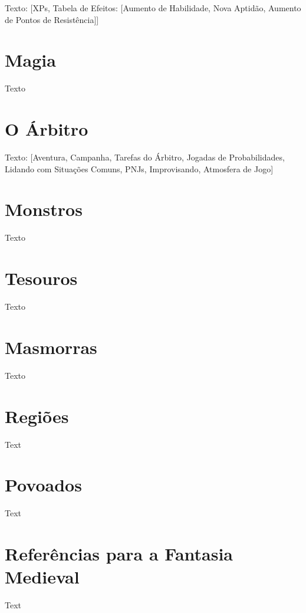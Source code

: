 \documentclass[a4paper, twocolumn, 10pt]{book}
\begin{document}
Texto: [XPs, Tabela de Efeitos: [Aumento de Habilidade, Nova Aptidão, Aumento de Pontos de Resistência]]

\chapter{Magia}

Texto

\chapter{O Árbitro}

Texto: [Aventura, Campanha, Tarefas do Árbitro, Jogadas de Probabilidades, Lidando com Situações Comuns, PNJs, Improvisando, Atmosfera de Jogo]

\chapter{Monstros}

Texto

\chapter{Tesouros}

Texto

\appendix

\chapter{Masmorras}

Texto

\chapter{Regiões}

Text

\chapter{Povoados}

Text

\chapter{Referências para a Fantasia Medieval}

Text
\end{document}
